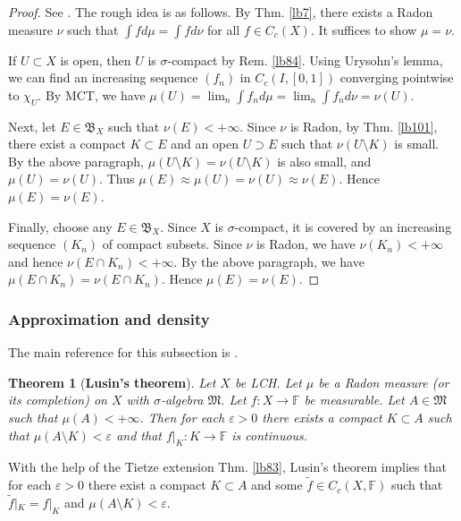 \documentclass[12pt,b5paper,notitlepage]{article}
\theoremstyle{definition}
\theoremstyle{plain}
\newtheorem{thm}[df]{Theorem}
\newcommand{\fk}{\mathfrak}
\newcommand{\wtd}{\widetilde}
\newcommand{\Fbb}{\mathbb F}
\newcommand{\eps}{\varepsilon}
\numberwithin{equation}{section}
\begin{document}
\begin{proof}
See \cite[Sec. 25.5]{Gui-A}. The rough idea is as follows. By Thm. \ref{lb7}, there exists a Radon measure $\nu$ such that $\int fd\mu=\int fd\nu$ for all $f\in C_c(X)$. It suffices to show $\mu=\nu$. 

If $U\subset X$ is open, then $U$ is $\sigma$-compact by Rem. \ref{lb84}. Using Urysohn's lemma, we can find an increasing sequence $(f_n)$ in $C_c(I,[0,1])$ converging pointwise to $\chi_U$. By MCT, we have $\mu(U)=\lim_n \int f_nd\mu=\lim_n\int f_nd\nu=\nu(U)$.

Next, let $E\in\fk B_X$ such that $\nu(E)<+\infty$. Since $\nu$ is Radon, by Thm. \ref{lb101}, there exist a compact $K\subset E$ and an open $U\supset E$ such that $\nu(U\setminus K)$ is small. By the above paragraph, $\mu(U\setminus K)=\nu(U\setminus K)$ is also small, and $\mu(U)=\nu(U)$. Thus $\mu(E)\approx\mu(U)=\nu(U)\approx\nu(E)$. Hence $\mu(E)=\nu(E)$.

Finally, choose any $E\in\fk B_X$. Since $X$ is $\sigma$-compact, it is covered by an increasing sequence $(K_n)$ of compact subsets. Since $\nu$ is Radon, we have $\nu(K_n)<+\infty$ and hence $\nu(E\cap K_n)<+\infty$. By the above paragraph, we have $\mu(E\cap K_n)=\nu(E\cap K_n)$. Hence $\mu(E)=\nu(E)$.
\end{proof}





\subsubsection{Approximation and density}

The main reference for this subsection is \cite[Sec. 27.2]{Gui-A}.





\begin{thm}[\textbf{Lusin's theorem}]\label{lb82}
Let $X$ be LCH. Let $\mu$ be a Radon measure (or its completion) on $X$ with $\sigma$-algebra $\fk M$. Let $f:X\rightarrow\Fbb$ be measurable. Let $A\in\fk M$ such that $\mu(A)<+\infty$. Then for each $\eps>0$ there exists a compact $K\subset A$ such that $\mu(A\setminus K)<\eps$ and that $f|_K:K\rightarrow\Fbb$ is continuous.
\end{thm}

With the help of the Tietze extension Thm. \ref{lb83}, Lusin's theorem implies that for each $\eps>0$ there exist a compact $K\subset A$ and some $\wtd f\in C_c(X,\Fbb)$ such that $\wtd f|_K=f|_K$ and $\mu(A\setminus K)<\eps$.
\end{document}

